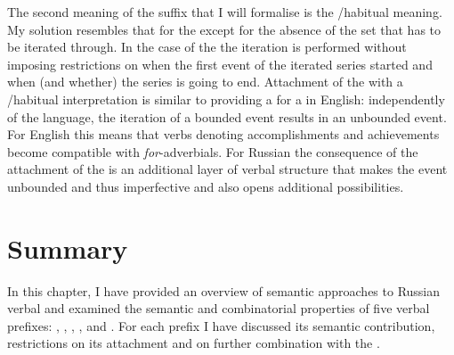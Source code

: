 
The second meaning of the  suffix that I will formalise is the /habitual meaning. My solution resembles that for the   except for the absence of the set that has to be iterated through. In the case of the  the iteration is performed without imposing restrictions on when the first event of the iterated series started and when (and whether) the series is going to end. Attachment of the  with a /habitual interpretation is similar to providing a   for a  in English: independently of the language, the iteration of a bounded event results in an unbounded event. For English this means that verbs denoting accomplishments and achievements become compatible with \textit{for}-adverbials. For Russian the consequence of the attachment of the  is an additional layer of verbal structure that makes the event unbounded and thus imperfective and also opens additional  possibilities. 


\section{Summary}
In this chapter, I have provided an overview of semantic approaches to Russian verbal  and examined the semantic and combinatorial properties of five verbal prefixes: , , , , and . For each prefix I have discussed its semantic contribution, restrictions on its attachment and on further combination with the . 

